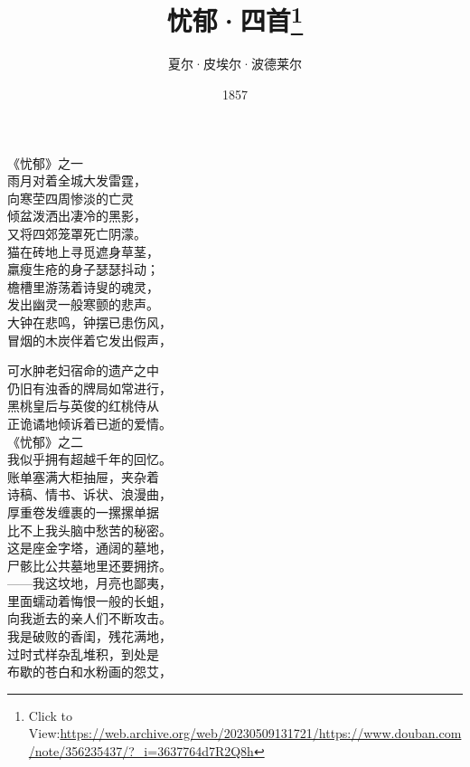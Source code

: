 \documentclass{article}
\title{忧郁·四首\footnote{Click to View:\url{https://web.archive.org/web/20230509131721/https://www.douban.com/note/356235437/?_i=3637764d7R2Q8h}}}
\author{夏尔·皮埃尔·波德莱尔}
\date{1857}
\begin{document}

\maketitle

\setlength\parindent{0pt}


\Large


﻿《忧郁》之一 \\ 


雨月对着全城大发雷霆，\\
向寒茔四周惨淡的亡灵\\
倾盆泼洒出凄冷的黑影，
\\
又将四郊笼罩死亡阴濛。 \\ 


猫在砖地上寻觅遮身草茎，\\
羸瘦生疮的身子瑟瑟抖动；\\
檐槽里游荡着诗叟的魂灵，
\\
发出幽灵一般寒颤的悲声。 \\ 


大钟在悲鸣，钟摆已患伤风，\\
冒烟的木炭伴着它发出假声，
\\
\newpage

可水肿老妇宿命的遗产之中 \\ 


仍旧有浊香的牌局如常进行，\\
黑桃皇后与英俊的红桃侍从
\\
正诡谲地倾诉着已逝的爱情。 \\ 


《忧郁》之二 \\ 


我似乎拥有超越千年的回忆。 \\ 


账单塞满大柜抽屉，夹杂着\\
诗稿、情书、诉状、浪漫曲，\\
厚重卷发缠裹的一摞摞单据\\
比不上我头脑中愁苦的秘密。\\
这是座金字塔，通阔的墓地，\\
尸骸比公共墓地里还要拥挤。\\
——我这坟地，月亮也鄙夷，\\
里面蠕动着悔恨一般的长蛆，\\
向我逝去的亲人们不断攻击。\\
我是破败的香闺，残花满地，\\
过时式样杂乱堆积，到处是\\
布歇的苍白和水粉画的怨艾，
\newpage
\end{document}
